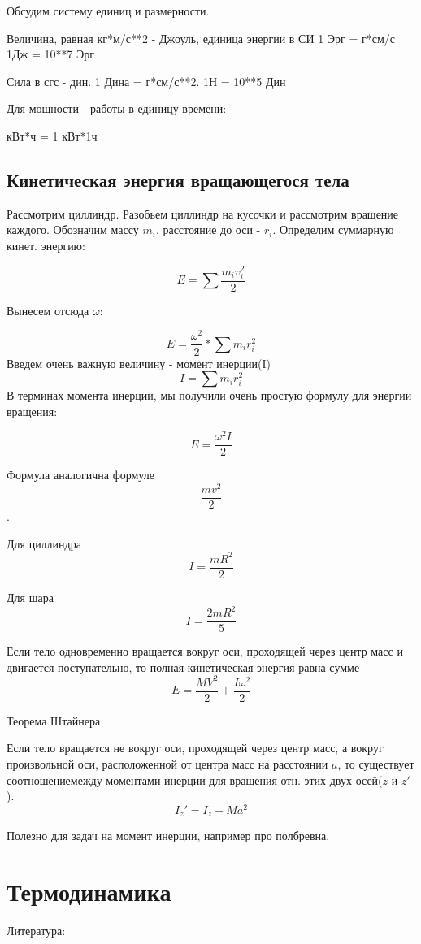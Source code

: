 \documentclass{article}
\begin{document}
Обсудим систему единиц и размерности.

Величина, равная кг*м/с**2 - Джоуль, единица энергии в СИ
1 Эрг = г*см/с
1Дж = 10**7 Эрг

Сила в сгс - дин. 1 Дина = г*см/с**2. 1Н = 10**5 Дин

Для мощности - работы в единицу времени:

кВт*ч = 1 кВт*1ч


\subsection{Кинетическая энергия вращающегося тела}
Рассмотрим циллиндр. Разобьем циллиндр на кусочки и рассмотрим вращение каждого. Обозначим массу $m_i$, расстояние до оси - $r_i$. Определим суммарную кинет. энергию:

$$E = \sum \frac{m_iv_i^2}{2}$$

Вынесем отсюда $\omega$:

$$E = \frac{\omega^2}{2}*\sum m_ir^2_i$$
Введем очень важную величину - момент инерции(I)
$$I = \sum m_ir^2_i$$
В терминах момента инерции, мы получили очень простую формулу для энергии вращения:

$$E = \frac{\omega^2 I}{2}$$

Формула аналогична формуле $$\frac{mv^2}{2}$$. 

Для циллиндра $$I = \frac{mR^2}{2}$$

Для шара $$I = \frac{2mR^2}{5}$$

Если тело одновременно вращается вокруг оси, проходящей через центр масс и двигается поступательно, то полная кинетическая энергия равна сумме $$E = \frac{MV^2}{2} + \frac{I\omega^2}{2}$$

Теорема Штайнера

Если тело вращается не вокруг оси, проходящей через центр масс, а вокруг произвольной оси, расположенной от центра масс на расстоянии $a$, то существует соотношениемежду моментами инерции для вращения отн. этих двух осей($z$ и $z'$). $$I_z' = I_z + Ma^2$$

Полезно для задач на момент инерции, например про полбревна.

\section{Термодинамика}

Литература: 
\end{document}
